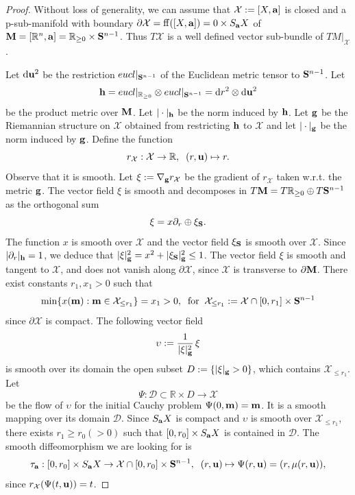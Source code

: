 \documentclass[11pt]{amsart}
\newcommand{\field}[1]{\mathbb{#1}}
\newcommand{\R}{\field{R}}
\newcommand{\ba}{{\bf a}}
\newcommand{\bbo}{{\bf 0}}
\newcommand{\bg}{{\bf g}}
\newcommand{\bh}{{\bf h}}
\newcommand{\bm}{{\bf m}}
\newcommand{\bM}{{\bf M}}
\newcommand{\bS}{{\bf S}}
\newcommand{\bu}{{\bf u}}
\newcommand{\cD}{\mathcal{D}}
\newcommand{\cX}{\mathcal{X}}
\newcommand{\dd}{{\partial}}
\newcommand{\ff}{{\rm ff}}
\newcommand{\nb}{{\nabla}}
\newcommand{\rd}{{\rm d}}
\newcommand{\Rgo}{{\R_{\geq 0}}}
\newcommand{\Rn}{{\R^n}}
\newcommand{\ups}{{\upsilon}}
\numberwithin{equation}{section}
\numberwithin{equation}{section}
\begin{document}
	\begin{proof}
		Without loss of generality, we can assume that $\cX: = [X,\ba]$ is closed and a p-sub-manifold with boundary $\dd \cX = \ff([X,\ba]) = 
		0 \times S_\ba X$ of $\bM =  [\Rn,\ba] = \Rgo\times\bS^{n-1}$.
		Thus $T\cX$ is a well defined vector sub-bundle of $TM|_\cX$.
		
		Let $\rd \bu^2$ be the restriction $eucl|_{\bS^{n-1}}$ of the 
		Euclidean metric tensor to $\bS^{n-1}$. Let 
		$$
		\bh = eucl|_\Rgo \otimes eucl|_{\bS^{n-1}} = \rd r^2 \otimes \rd\bu^2
		$$
		be the product metric over $\bM$.
		Let $|\cdot|_\bh$ be the norm induced by $\bh$. 
		Let $\bg$ be the Riemannian structure on $\cX$ obtained 
		from restricting $\bh$ to $\cX$ and let $|\cdot|_\bg$ be the norm induced by 
		$\bg$.
		Define the function
		$$
		r_\cX: \cX\to \R, \;\; (r,\bu) \mapsto r.
		$$ 
		Observe that it is smooth.  
		Let $\xi := \nb_\bg r_\cX$ be the gradient of $r_\cX$ taken w.r.t. the 
		metric $\bg$. 
		The vector field
		$\xi$ is smooth and decomposes in $T\bM = T\Rgo \oplus T\bS^{n-1}$ as the 
		orthogonal sum  
		$$
		\xi  = x \dd_r \oplus \xi_\bS.
		$$
		The function $x$ is smooth over $\cX$ and the 
		vector field $\xi_\bS$ is smooth over $\cX$. Since $|\dd_r|_\bh = 1$, 
		we deduce that $|\xi|_\bg^2 = x^2 + |\xi_\bS|_\bg^2 \leq 1$. 
		The vector field $\xi$ is smooth and tangent to $\cX$, and does not vanish
		along $\dd\cX$, since $\cX$ is transverse to $\dd\bM$. 
		There exist constants $r_1,x_1> 0$ such that 
		$$
		\min \{x(\bm) : \bm \in \cX_{\leq r_1} \} = x_1 >0, \;\; {\rm for} \;\;
\cX_{\leq r_1} := \cX \cap [0,r_1]\times \bS^{n-1}
		$$
		since $\dd\cX$ is compact. 
		The following vector field  
		$$
		\ups := \frac{1}{|\xi|_\bg^2} \,\xi
		$$
		is smooth over its domain the open subset $D := \{|\xi|_\bg>0\}$,  
		which contains $\cX_{\leq r_1}$. Let 
		$$
		\Psi: \cD \subset \R\times D \to \cX
		$$ 
		be the flow of $\ups$ for the initial Cauchy problem $\Psi(0,\bm) = \bm$.
		It is a smooth mapping over its domain $\cD$.
		Since $S_\ba X$ is compact and $\ups$ is smooth over $\cX_{\leq r_1}$, 
		there exists $r_1\geq r_0(>0)$ such  
		that $[0,r_0]\times S_\ba X$ is contained in $\cD$. 
		The smooth diffeomorphism we are looking for is 
		$$
		\tau_\ba : [0,r_0]\times S_\ba X \to \cX \cap [0,r_0]\times \bS^{n-1}, 
		\;\; (r,\bu) \mapsto \Psi(r,\bu) = (r,\mu(r,\bu)),
		$$
		since $r_\cX(\Psi(t,\bu)) = t$.
	\end{proof}
\end{document}
